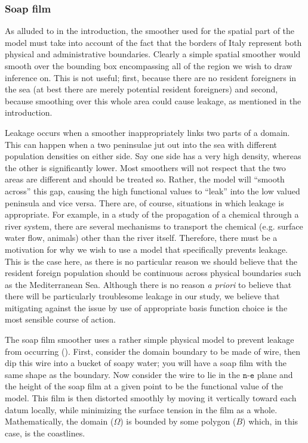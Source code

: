 \subsubsection{Soap film \label{SF}}

As alluded to in the introduction, the smoother used for the spatial part of the model must take into account of the fact that the borders of Italy represent both physical and administrative boundaries. Clearly a simple spatial smoother would smooth over the bounding box encompassing all of the region we wish to draw inference on. This is not useful; first, because there are no resident foreigners in the sea (at best there are merely potential resident foreigners) and second, because smoothing over this whole area could cause leakage, as mentioned in the introduction.

Leakage occurs when a smoother inappropriately links two parts of a domain. This can happen when a two peninsulae jut out into the sea with different population densities on either side. Say one side has a very high density, whereas the other is significantly lower. Most smoothers will not respect that the two areas are different and should be treated so. Rather, the model will ``smooth across'' this gap, causing the high functional values to ``leak'' into the low valued peninsula and vice versa. There are, of course, situations in which leakage is appropriate. For example, in a study of the propagation of a chemical through a river system, there are several mechanisms to transport the chemical (e.g. surface water flow, animals) other than the river itself. Therefore, there must be a motivation for why we wish to use a model that specifically prevents leakage. This is the case here, as there is no particular reason we should believe that the resident foreign population should be continuous across physical boundaries such as the Mediterranean Sea. Although there is no reason \textit{a priori} to believe that there will be particularly troublesome leakage in our study, we believe that mitigating against the issue by use of appropriate basis function choice is the most sensible course of action. 

The soap film smoother uses a rather simple physical model to prevent leakage from occurring (\cite{soap}). First, consider the domain boundary to be made of wire, then dip this wire into a bucket of soapy water; you will have a soap film with the same shape as the boundary. Now consider the wire to lie in the $\texttt{n}$-$\texttt{e}$ plane and the height of the soap film at a given point to be the functional value of the model. This film is then distorted smoothly by moving it vertically toward each datum locally, while minimizing the surface tension in the film as a whole. Mathematically, the domain ($\Omega$) is bounded by some polygon ($B$) which, in this case, is the coastlines.


